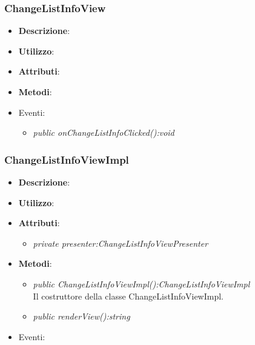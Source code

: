 \subsubsection{ChangeListInfoView}
\begin{itemize}
\item \textbf{Descrizione}: 
\item \textbf{Utilizzo}:
\item \textbf{Attributi}: 
\item \textbf{Metodi}:
\item{Eventi}:
	\begin{itemize}	
	\item \textit{public onChangeListInfoClicked():void}\\

	\end{itemize}
\end{itemize}

\subsubsection{ChangeListInfoViewImpl}
\begin{itemize}
\item \textbf{Descrizione}: 
\item \textbf{Utilizzo}:
\item \textbf{Attributi}: 
	\begin{itemize}
	\item \textit{private presenter:ChangeListInfoViewPresenter}\\
	
	\end{itemize}
\item \textbf{Metodi}:
	\begin{itemize}
	\item \textit{public ChangeListInfoViewImpl():ChangeListInfoViewImpl}\\
	Il costruttore della classe ChangeListInfoViewImpl.	
	\item \textit{public renderView():string}\\

	\end{itemize}
\item{Eventi}:
\end{itemize}

